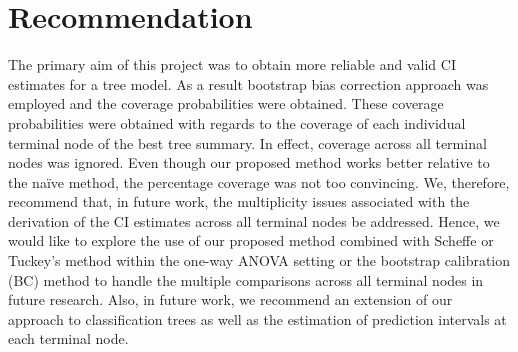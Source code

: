 \section{Recommendation}

The primary aim of this project was to obtain more reliable and valid CI estimates for a tree model. As a result bootstrap bias correction approach was employed and the coverage probabilities were obtained. These coverage probabilities were obtained with regards to the coverage of each individual terminal node of the best tree summary. In effect, coverage across all terminal nodes was ignored. Even though our proposed method works better relative to the na\"{i}ve method, the percentage coverage was not too convincing. We, therefore, recommend that, in future work, the multiplicity issues associated with the derivation of the CI estimates across all terminal nodes be addressed. Hence, we would like to explore the use of our proposed method combined with Scheffe or Tuckey's method within the one-way ANOVA setting or the bootstrap calibration (BC) method to handle the multiple comparisons across all terminal nodes in future research. Also, in future work, we recommend an extension of our approach to classification trees as well as the estimation of prediction intervals at each terminal node.